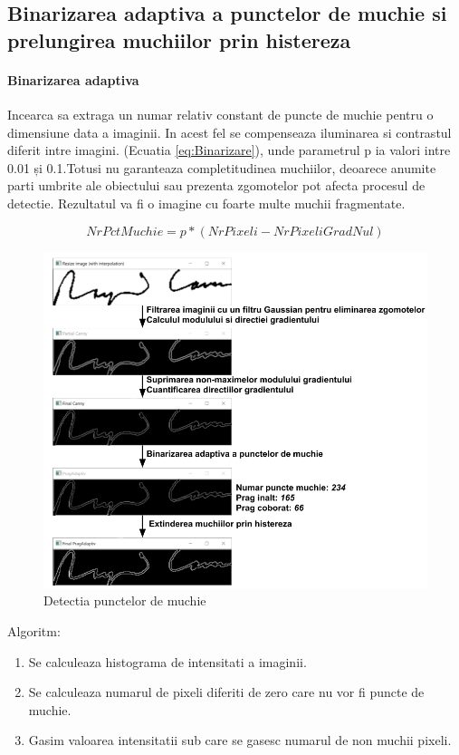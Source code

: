 \documentclass[conference]{IEEEtran}
\begin{document}
\subsection{Binarizarea adaptiva a punctelor de muchie si prelungirea muchiilor prin histereza}
\paragraph{Binarizarea adaptiva} 
Incearca sa extraga un numar relativ constant de puncte de muchie pentru o dimensiune data a imaginii. In acest fel se compenseaza iluminarea si contrastul diferit intre imagini. (Ecuatia \ref{eq:Binarizare}), unde parametrul p ia valori intre 0.01 și 0.1.Totusi nu garanteaza completitudinea muchiilor, deoarece anumite parti umbrite ale obiectului sau prezenta zgomotelor pot afecta procesul de detectie. Rezultatul va fi o imagine cu foarte multe muchii fragmentate.

\begin{equation} \label{eq:Binarizare}
NrPctMuchie = p * (NrPixeli - NrPixeliGradNul)
\end{equation}

\begin{figure}[h!]
	\includegraphics[width=\linewidth]{Figures/Canny.png}
	\caption{Detectia punctelor de muchie}
	\label{fig:Canny}
\end{figure}

Algoritm:
\begin{enumerate}
	\item Se calculeaza histograma de intensitati a imaginii.
	\item Se calculeaza numarul de pixeli diferiti de zero care nu vor fi puncte de muchie.
	\item Gasim valoarea intensitatii sub care se gasesc numarul de non muchii pixeli.
\end{enumerate}
\end{document}

